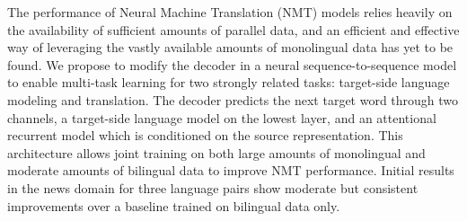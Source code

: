 The performance of Neural Machine Translation (NMT) models relies heavily on the availability of sufficient amounts of parallel data, and an efficient and effective way of leveraging the vastly available amounts of monolingual data has yet to be found. We propose to modify the decoder in a neural sequence-to-sequence model to enable multi-task learning for two strongly related tasks: target-side language modeling and translation. The decoder predicts the next target word through two channels, a target-side language model on the lowest layer, and an attentional recurrent model which is conditioned on the source representation. This architecture allows joint training on both large amounts of monolingual and moderate amounts of bilingual data to improve NMT performance. Initial results in the news domain for three language pairs show moderate but consistent improvements over a baseline trained on bilingual data only.
